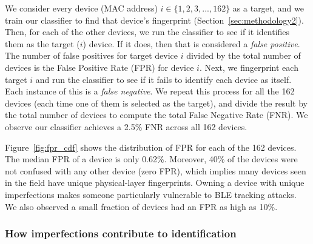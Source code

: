 
We consider every device (MAC address) $i \in \{1,2,3,...,162\}$ as a target,
and we train our classifier to find that device's fingerprint
(Section~\ref{sec:methodology2}).  Then, for each of the other devices, we run
the classifier to see if it identifies them as the target ($i$) device. If it
does, then that is considered a \emph{false positive}. The number of false
positives for target device $i$ divided by the total number of devices is the
False Positive Rate (FPR) for device $i$. Next, we fingerprint
each target $i$ and run the classifier to see if it fails to identify each device as
itself. Each instance of this is a \emph{false negative}. We repeat this process for all the 162 devices (each time one of
them is selected as the target), and divide the result by the total number of
devices to compute the total False Negative Rate (FNR). We observe our
classifier achieves a 2.5\% FNR across all 162 devices.



Figure~\ref{fig:fpr_cdf} shows the distribution of FPR for each of the 162 devices.
The median FPR of a device is only 0.62\%. Moreover, 40\%
of the devices were not confused with any other device (zero FPR), which implies many
devices seen in the field
have unique physical-layer fingerprints. Owning a device with unique 
imperfections makes someone particularly vulnerable to BLE tracking attacks. We also
observed
a small fraction of devices had an FPR as high as 10\%.



\subsubsection{How imperfections contribute to identification}

